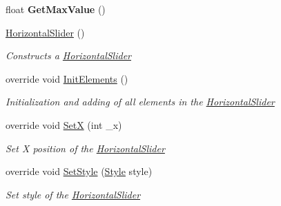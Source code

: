 \begin{DoxyCompactItemize}
\mbox{\label{class_space_v_i_l_1_1_horizontal_slider_a94e1abf73d109099bad642b521b965aa}} 
float {\bfseries Get\+Max\+Value} ()
\item 
\mbox{\hyperlink{class_space_v_i_l_1_1_horizontal_slider_ae040dcab9cc4d7c00b949b47adc0eeb5}{Horizontal\+Slider}} ()
\begin{DoxyCompactList}\small\item\em Constructs a \mbox{\hyperlink{class_space_v_i_l_1_1_horizontal_slider}{Horizontal\+Slider}} \end{DoxyCompactList}\item 
override void \mbox{\hyperlink{class_space_v_i_l_1_1_horizontal_slider_a6b0ab83eeb781a73e8196b744564cd3e}{Init\+Elements}} ()
\begin{DoxyCompactList}\small\item\em Initialization and adding of all elements in the \mbox{\hyperlink{class_space_v_i_l_1_1_horizontal_slider}{Horizontal\+Slider}} \end{DoxyCompactList}\item 
override void \mbox{\hyperlink{class_space_v_i_l_1_1_horizontal_slider_ab674da8d7310f5b68f9c85975073b076}{SetX}} (int \+\_\+x)
\begin{DoxyCompactList}\small\item\em Set X position of the \mbox{\hyperlink{class_space_v_i_l_1_1_horizontal_slider}{Horizontal\+Slider}} \end{DoxyCompactList}\item 
override void \mbox{\hyperlink{class_space_v_i_l_1_1_horizontal_slider_aa8a43a400a6fcab217d8af348071bc5f}{Set\+Style}} (\mbox{\hyperlink{class_space_v_i_l_1_1_decorations_1_1_style}{Style}} style)
\begin{DoxyCompactList}\small\item\em Set style of the \mbox{\hyperlink{class_space_v_i_l_1_1_horizontal_slider}{Horizontal\+Slider}} \end{DoxyCompactList}\end{DoxyCompactItemize}
